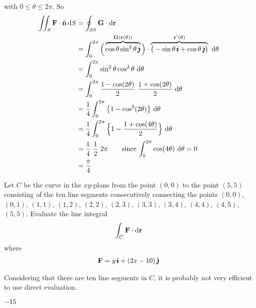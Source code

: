 \begin{solution}
with $0\le\theta\le 2\pi$.
So
\begin{align*}
\dblInt_S\vF\cdot\hn\,\dee{S}
   &=\oint_{\partial S} \vG\cdot\dee{\vr} \\
&=\int_0^{2\pi} 
   \Big(\overbrace{\cos\theta\sin^2\theta\,\hj}^{\vG(\vr(\theta))}\Big)
    \cdot\overbrace{\big(-\sin\theta\,\hi +\cos\theta\,\hj\big)}^{\vr'(\theta)}
      \  \dee{\theta} \\
&=\int_0^{2\pi} \sin^2\theta\cos^2\theta\ \dee{\theta} \\
&=\int_0^{2\pi} \frac{1-\cos(2\theta)}{2}\ \frac{1+\cos(2\theta)}{2}\ 
                         \dee{\theta} \\
&=\frac{1}{4}\int_0^{2\pi}  \big\{ 1-\cos^2(2\theta)\big\}\ 
                         \dee{\theta} \\
&=\frac{1}{4}\int_0^{2\pi}  \Big\{ 1-\frac{1+\cos(4\theta)}{2}\Big\}\ 
                         \dee{\theta} \\
& = \frac{1}{4}\ \frac{1}{2}\ 2\pi 
    \qquad\text{since $\int_0^{2\pi} \cos(4\theta)\ \dee{\theta}=0$} \\
&=\frac{\pi}{4}
\end{align*}
\end{solution}

\begin{question}[M317 2006D] %
Let $C$ be the curve in the $xy$-plane from the point $(0, 0)$ to 
the point $(5, 5)$ consisting of the ten line segments consecutively 
connecting the points $(0,0)$, $(0,1)$, $(1,1)$, $(1,2)$, $(2,2)$, $(2,3)$,
$(3,3)$, $(3,4)$, $(4,4)$, $(4,5)$, $(5,5)$. Evaluate the line integral
\begin{align*}
\int_C \mathbf{F} \cdot\mathrm{d}\mathbf{r}
\end{align*}
where
\begin{align*}
\mathbf{F} = y\,\hat{\pmb{\imath}} + (2x - 10)\,\hat{\pmb{\jmath}}
\end{align*}
\end{question}

\begin{hint} 
Considering that there are ten line segments in $C$,
it is probably not very efficient to use direct evaluation.
\end{hint}

\begin{answer} 
$-15$
\end{answer}


